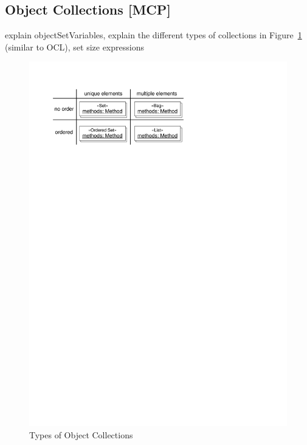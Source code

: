 {
\subsection{Object Collections [MCP]}
\label{sec:StoryPatterns:objectsets}

explain objectSetVariables, explain the different types of collections in Figure~\ref{fig:ObjectSetsTypes} (similar to OCL), set size expressions

\begin{figure}[htb]
  \centering
  \includegraphics[scale=0.8]{figures/ObjectSets}
  \caption{Types of Object Collections}
  \label{fig:ObjectSetsTypes}
\end{figure}


}
